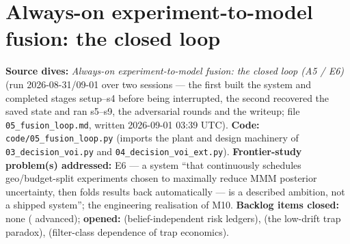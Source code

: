 \chapter{Always-on experiment-to-model fusion: the closed loop}
\label{ch:fusion}

\begin{provenance}
\textbf{Source dives:}  \emph{Always-on experiment-to-model fusion: the closed loop (A5 / E6)} (run 2026-08-31/09-01 over two sessions --- the first built the system and completed stages setup--s4 before being interrupted, the second recovered the saved state and ran s5--s9, the adversarial rounds and the writeup; file \texttt{05\_fusion\_loop.md}, written 2026-09-01 03:39 UTC).
\textbf{Code:} \texttt{code/05\_fusion\_loop.py} (imports the plant and design machinery of \texttt{03\_decision\_voi.py} and \texttt{04\_decision\_voi\_ext.py}).
\textbf{Frontier-study problem(s) addressed:} E6 --- a system ``that continuously schedules geo/budget-split experiments chosen to maximally reduce MMM posterior uncertainty, then folds results back automatically --- is a described ambition, not a shipped system''; the engineering realisation of M10.
\textbf{Backlog items closed:} none ( advanced); \textbf{opened:}  (belief-independent risk ledgers),  (the low-drift trap paradox),  (filter-class dependence of trap economics).
\end{provenance}

